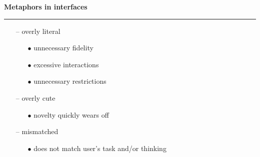 \documentclass[pdf]{beamer}
\begin{document}
\begin{frame}
{\textbf{Metaphors in interfaces}}{\textcolor{red}{\rule{12cm}{1.2pt}}}

    \begin{itemize}
      \item[--] {overly literal}
      \begin{itemize}
       	\item[{$\bullet$}] {unnecessary fidelity}
        \item[{$\bullet$}] {excessive interactions}
        \item[{$\bullet$}] {unnecessary restrictions}
       \end{itemize}
       \vspace{10px}
       \item[--] {overly cute}
       \begin{itemize}
       	\item[{$\bullet$}] {novelty quickly wears off}
       \end{itemize}
       \vspace{10px}
       \item[--] {mismatched}
       \begin{itemize}
       	\item[{$\bullet$}] {does not match user's \newline task and/or thinking}
       \end{itemize}
    \end{itemize}
    

\end{frame}
\end{document}
